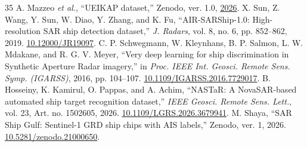 \documentclass[journal]{IEEEtran}
\begin{document}
\begin{thebibliography}{35}
 A. Mazzeo \emph{et al.}, ``UEIKAP dataset,'' Zenodo, ver. 1.0, \href{https://doi.org/10.5281/zenodo.18391027}{2026}.
 X. Sun, Z. Wang, Y. Sun, W. Diao, Y. Zhang, and K. Fu, ``AIR-SARShip-1.0: High-resolution SAR ship detection dataset,'' \emph{J. Radars}, vol. 8, no. 6, pp. 852--862, 2019. \href{https://doi.org/10.12000/JR19097}{10.12000/JR19097}.
 C. P. Schwegmann, W. Kleynhans, B. P. Salmon, L. W. Mdakane, and R. G. V. Meyer, ``Very deep learning for ship discrimination in Synthetic Aperture Radar imagery,'' in \emph{Proc. IEEE Int. Geosci. Remote Sens. Symp. (IGARSS)}, 2016, pp. 104--107. \href{https://doi.org/10.1109/IGARSS.2016.7729017}{10.1109/IGARSS.2016.7729017}.
 B. Hosseiny, K. Kamirul, O. Pappas, and A. Achim, ``NASTaR: A NovaSAR-based automated ship target recognition dataset,'' \emph{IEEE Geosci. Remote Sens. Lett.}, vol. 23, Art. no. 1502605, 2026. \href{https://doi.org/10.1109/LGRS.2026.3679941}{10.1109/LGRS.2026.3679941}.
 M. Shaya, ``SAR Ship Gulf: Sentinel-1 GRD ship chips with AIS labels,'' Zenodo, ver. 1, 2026. \href{https://doi.org/10.5281/zenodo.21000650}{10.5281/zenodo.21000650}.
\end{thebibliography}
\end{document}
